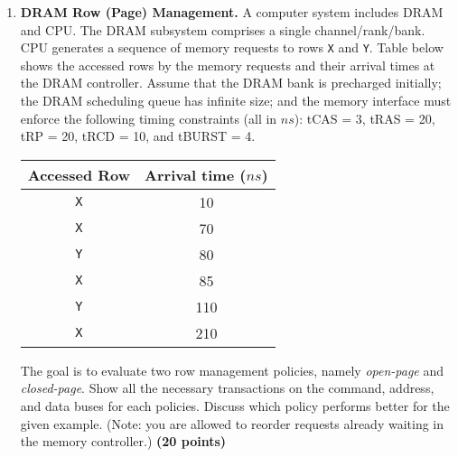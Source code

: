 \documentclass[a4paper, 11pt]{exam}
\begin{document}
\begin{enumerate}

\item \textbf{DRAM Row (Page) Management.}
A computer system includes DRAM and CPU.
The DRAM subsystem comprises a single channel/rank/bank.
CPU generates a sequence of memory requests to rows \texttt{X} and \texttt{Y}.
Table below shows the accessed rows by the memory requests and their arrival times at the DRAM controller.
Assume that the DRAM bank is precharged initially; the DRAM scheduling queue has infinite size; and the memory interface must enforce the following timing constraints (all in $ns$):
tCAS = 3, tRAS = 20, tRP = 20, tRCD = 10, and tBURST = 4. 

\begin{center}
	\begin{tabular}{|c|c|}
		\hline
		\textbf{Accessed Row} & \textbf{Arrival time ($ns$)} \\
		\hline
		\texttt{X}  & 10 \\
		\hline
		\texttt{X}  & 70 \\
		\hline
		\texttt{Y}  & 80 \\
		\hline
		\texttt{X}  & 85 \\
		\hline
		\texttt{Y}  & 110 \\
		\hline
		\texttt{X} & 210 \\
		\hline
	\end{tabular}
\end{center}

The goal is to evaluate two row management policies, namely \textit{open-page} and \textit{closed-page}.
Show all the necessary transactions on the command, address, and data buses for each policies.
Discuss which policy performs better for the given example.
(Note: you are allowed to reorder requests already waiting in the memory controller.)
\textbf{(20 points)}
\begin{figure}[h!]
	\begin{center}
	\end{center}
\end{figure}


\end{enumerate}
\end{document}
